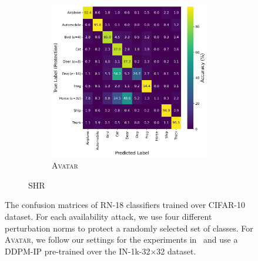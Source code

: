 \documentclass[conference]{IEEEtran}
\theoremstyle{definition}
\theoremstyle{remark}
\theoremstyle{proposition}
\begin{document}
\begin{figure}[tb!]
\begin{subfigure}{1.0\textwidth}
\begin{subfigure}{.40\textwidth}
    		\includegraphics[width=1.0\textwidth]{combination_attacks/ResNet18_SHR_eps_combo_t_200_confusion_matrix.png}
            \caption*{\textsc{Avatar}}
    	\end{subfigure}
	\caption{SHR~\citep{yu2022shr}}
    \end{subfigure}
    \caption{The confusion matrices of RN-18 classifiers trained over CIFAR-10 dataset. For each availability attack, we use four different perturbation norms to protect a randomly selected set of classes. For \textsc{Avatar}, we follow our settings for the experiments in~ and use a DDPM-IP pre-trained over the IN-1k-32$\times$32 dataset.}
	\label{fig:epsilon_attacks}
\end{figure}
\end{document}
